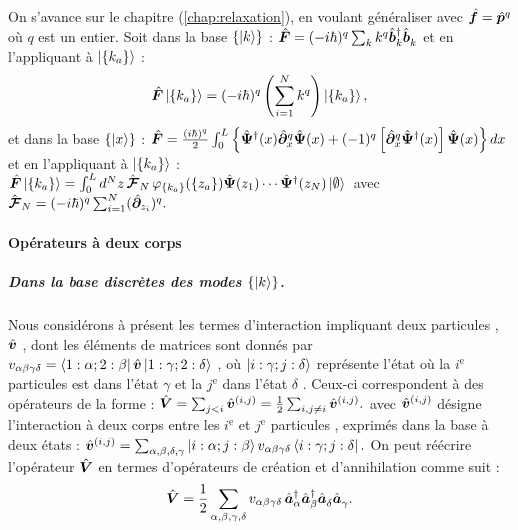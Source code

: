 \begin{mdframed}[
	linewidth=0.5pt, 
	backgroundcolor=gray!5, 
	roundcorner=50pt,	
	innerleftmargin=5pt,
    innerrightmargin=5pt,
    innertopmargin=5pt,
    innerbottommargin=2pt,
    leftmargin=2pt,
    rightmargin=2pt
	]
On s'avance sur le chapitre (\ref{chap:relaxation}), en voulant généraliser avec $\hat{\bm{f}} = \hat{\bm{p}}^q$ où $q$ est un entier. Soit dans la base \(\{\ket{k}\}\) : \(\hat{\bm{F}} = (-i\hbar)^q \sum_k k^q \hat{\bm{b}}_k^\dagger \hat{\bm{b}}_k^{} \) et en l'appliquant à \(\ket{\{k_a\}}\) :  
\begin{eqnarray}
	 \hat{\bm{F}} \ket{\{k_a\}} = (-i\hbar)^q \left( \sum_{i = 1}^N k^q \right) \ket{\{k_a\}},
\end{eqnarray}
et dans la base \(\{\ket{x}\}\) : 	
\(
	\hat{\bm{F}}  =  \frac{(i\hbar)^q}2 \int_0^L \left \{  \hat{\bm{\Psi}}^\dag(x) \hat{\bm{\partial}}_x^q \hat{\bm{\Psi}}(x) + (-1)^q \left [\hat{\bm{\partial}}_x^q \hat{\bm{\Psi}}^\dag(x)\right ]\hat{\bm{\Psi}}(x)\right \} dx
\)
et en l'appliquant à \(\ket{\{k_a\}}\) : 
\(
	\hat{\bm{F}}\ket{ \{k_a\}} =  \int_0^L d^N z \, \hat{\bm{\mathcal{F}}}_N \, \varphi_{\{k_a\}}(\{z_a\} ) \hat{\bm{\Psi}}(z_1) \cdots \hat{\bm{\Psi}}^\dag(z_N) \ket{\emptyset}\, 
\) \mbox{avec} 
\(\hat{\bm{\mathcal{F}}}_N = (-i\hbar)^q \sum_{i=1}^N (\hat{\bm{\partial}}_{z_i})^q.
\)
\end{mdframed}

\paragraph{Opérateurs à deux corps}

\subparagraph{Dans la base discrètes des modes \( \{ \ket{k} \} \).}

Nous considérons à présent les termes d’interaction impliquant deux particules , $\hat{\bm{v}}$ , dont les éléments de matrices sont donnés par $v_{\alpha \beta \gamma \delta} = \bra{ 1 : \alpha; 2 : \beta } \hat{\bm{v}}\ket{ 1 : \gamma; 2 : \delta }$ , où $\ket{ i : \gamma; j : \delta }$ représente l'état où la $i^\text{e}$  particules est dans l'état $\gamma$ et la $j^\text{e}$ dans l'état $\delta$  . Ceux-ci correspondent à des opérateurs de la forme :
\(
    \hat{\bm{V}} = \sum_{j < i} \hat{\bm{v}}^{(i, j)} = \frac{1}{2} \sum_{i, j \ne i} \hat{\bm{v}}^{(i, j)}
    \label{eq:V2corps}.
\)
avec $\hat{\bm{v}}^{(i, j)}$ désigne l’interaction à deux corps entre les $i^\text{e}$ et $j^\text{e}$ particules , exprimés dans la base à deux états :
\(
	\hat{\bm{v}}^{(i, j)} = \sum_{\alpha,\beta,\delta,\gamma} \ket{i : \alpha; j : \beta }v_{\alpha \beta \gamma \delta} \bra{ i : \gamma; j : \delta }.
    \label{eq:matriceV}
\)
On peut réécrire l’opérateur \( \hat{\bm{V}} \) en termes d’opérateurs de création et d’annihilation comme suit :
\begin{equation}
    \hat{\bm{V}} = \frac{1}{2} \sum_{\alpha, \beta, \gamma, \delta} v_{\alpha \beta \gamma \delta} \, \hat{\bm{a}}^\dagger_\alpha \hat{\bm{a}}^\dagger_\beta \hat{\bm{a}}_\delta^{} \hat{\bm{a}}_\gamma^{}.
    \label{chap.1:eq.rapel.opp.1.second.1}
\end{equation}

